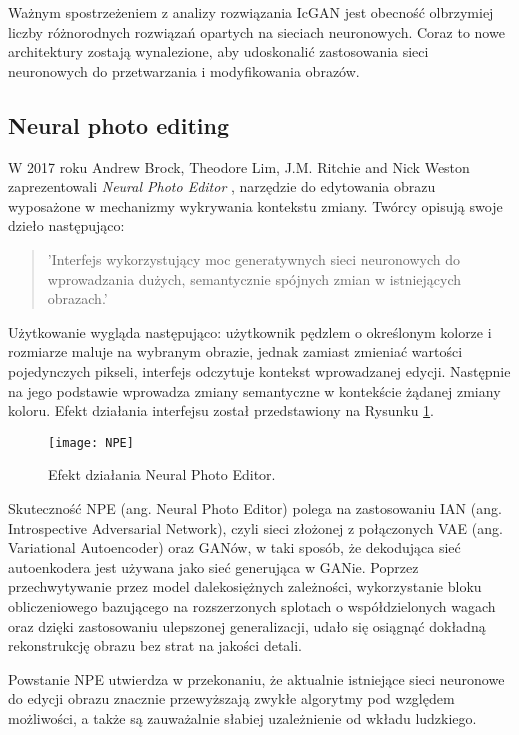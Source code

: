     Ważnym spostrzeżeniem z analizy rozwiązania IcGAN jest obecność
    olbrzymiej liczby różnorodnych rozwiązań opartych na sieciach neuronowych.
    Coraz to nowe architektury zostają wynalezione, aby udoskonalić
    zastosowania sieci neuronowych do przetwarzania i modyfikowania obrazów.

  \subsection{Neural photo editing}
    W 2017 roku Andrew Brock, Theodore Lim, J.M. Ritchie and Nick Weston
    zaprezentowali \textit{Neural Photo Editor} \cite{neural_photo_editor}, narzędzie
    do edytowania obrazu wyposażone w mechanizmy wykrywania kontekstu zmiany.
    Twórcy opisują swoje dzieło następująco:

    \begin{quote}
      'Interfejs wykorzystujący moc generatywnych sieci neuronowych do
      wprowadzania dużych, semantycznie spójnych zmian w istniejących obrazach.'
    \end{quote}

    Użytkowanie wygląda następująco: użytkownik pędzlem o określonym kolorze i
    rozmiarze maluje na wybranym obrazie, jednak zamiast zmieniać wartości
    pojedynczych pikseli, interfejs odczytuje kontekst wprowadzanej edycji.
    Następnie na jego podstawie wprowadza zmiany
    semantyczne w kontekście żądanej zmiany koloru. Efekt działania interfejsu
    został przedstawiony na Rysunku \ref{fig:npe}.

    \begin{figure}[ht]
      \centering
      \texttt{[image: NPE]}
      \caption[Efekt działania \textit{Neural Photo Editor} - źródło: \cite{neural_photo_editor}]
      {Efekt działania Neural Photo Editor.}
      \label{fig:npe}
    \end{figure}

    Skuteczność NPE (ang. Neural Photo Editor) polega na zastosowaniu IAN
    (ang. Introspective Adversarial Network), czyli sieci złożonej z połączonych
    VAE (ang. Variational Autoencoder) \cite{vae} oraz GANów, w taki sposób, że dekodująca
    sieć autoenkodera jest używana jako sieć generująca w GANie.
    Poprzez przechwytywanie przez model dalekosiężnych zależności, wykorzystanie
    bloku obliczeniowego bazującego na rozszerzonych splotach o
    współdzielonych wagach oraz dzięki zastosowaniu ulepszonej generalizacji,
    udało się osiągnąć dokładną rekonstrukcję obrazu bez strat na jakości detali.

    Powstanie NPE utwierdza w przekonaniu, że aktualnie istniejące sieci
    neuronowe do edycji obrazu znacznie przewyższają zwykłe algorytmy pod
    względem możliwości, a także są zauważalnie słabiej uzależnienie od wkładu
    ludzkiego.
